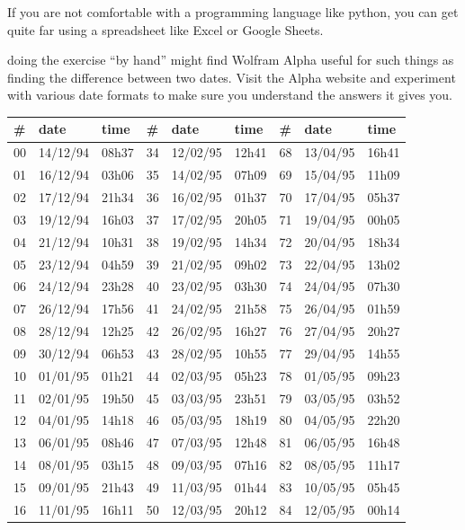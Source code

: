 \documentclass{tufte-handout}
\begin{document}
If you are not comfortable with a programming language like python, you can get quite far using a spreadsheet like Excel or Google Sheets.

 doing the exercise ``by hand'' might find Wolfram Alpha useful for such things as finding the difference between two dates.  Visit the Alpha website and experiment with various date formats to make sure you understand the answers it gives you.


\begin{table}
\begin{tabular}{lll|lll|lll}
\# & date & time & \# & date & time & \# & date & time \\ \hline
00 & 14/12/94 & 08h37 & 34 & 12/02/95 & 12h41 & 68 & 13/04/95 & 16h41 \\
01 & 16/12/94 & 03h06 & 35 & 14/02/95 & 07h09 & 69 & 15/04/95 & 11h09 \\
02 & 17/12/94 & 21h34 & 36 & 16/02/95 & 01h37 & 70 & 17/04/95 & 05h37 \\
03 & 19/12/94 & 16h03 & 37 & 17/02/95 & 20h05 & 71 & 19/04/95 & 00h05 \\
04 & 21/12/94 & 10h31 & 38 & 19/02/95 & 14h34 & 72 & 20/04/95 & 18h34 \\
05 & 23/12/94 & 04h59 & 39 & 21/02/95 & 09h02 & 73 & 22/04/95 & 13h02 \\
06 & 24/12/94 & 23h28 & 40 & 23/02/95 & 03h30 & 74 & 24/04/95 & 07h30 \\
07 & 26/12/94 & 17h56 & 41 & 24/02/95 & 21h58 & 75 & 26/04/95 & 01h59 \\
08 & 28/12/94 & 12h25 & 42 & 26/02/95 & 16h27 & 76 & 27/04/95 & 20h27 \\
09 & 30/12/94 & 06h53 & 43 & 28/02/95 & 10h55 & 77 & 29/04/95 & 14h55 \\
10 & 01/01/95 & 01h21 & 44 & 02/03/95 & 05h23 & 78 & 01/05/95 & 09h23 \\
11 & 02/01/95 & 19h50 & 45 & 03/03/95 & 23h51 & 79 & 03/05/95 & 03h52 \\
12 & 04/01/95 & 14h18 & 46 & 05/03/95 & 18h19 & 80 & 04/05/95 & 22h20 \\
13 & 06/01/95 & 08h46 & 47 & 07/03/95 & 12h48 & 81 & 06/05/95 & 16h48 \\
14 & 08/01/95 & 03h15 & 48 & 09/03/95 & 07h16 & 82 & 08/05/95 & 11h17 \\
15 & 09/01/95 & 21h43 & 49 & 11/03/95 & 01h44 & 83 & 10/05/95 & 05h45 \\
16 & 11/01/95 & 16h11 & 50 & 12/03/95 & 20h12 & 84 & 12/05/95 & 00h14 \\

\end{tabular}
\end{table}
\end{document}

